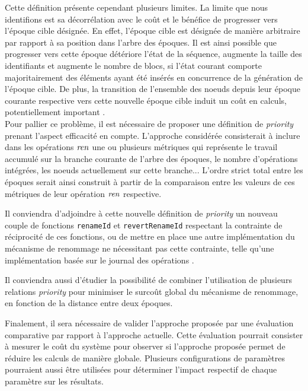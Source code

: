 Cette définition présente cependant plusieurs limites.
La limite que nous identifions est sa décorrélation avec le coût et le bénéfice de progresser vers l'époque cible désignée.
En effet, l'époque cible est désignée de manière arbitraire par rapport à sa position dans l'arbre des époques.
Il est ainsi possible que progresser vers cette époque détériore l'état de la séquence, \ie augmente la taille des identifiants et augmente le nombre de blocs, \eg si l'état courant comporte majoritairement des éléments ayant été insérés en concurrence de la génération de l'époque cible.
De plus, la transition de l'ensemble des noeuds depuis leur époque courante respective vers cette nouvelle époque cible induit un coût en calculs, potentiellement important .\\

Pour pallier ce problème, il est nécessaire de proposer une définition de \emph{priority} prenant l'aspect efficacité en compte.
L'approche considérée consisterait à inclure dans les opérations $\mathit{ren}$ une ou plusieurs métriques qui représente le travail accumulé sur la branche courante de l'arbre des époques, \eg le nombre d'opérations intégrées, les noeuds actuellement sur cette branche...
L'ordre strict total entre les époques serait ainsi construit à partir de la comparaison entre les valeurs de ces métriques de leur opération $\mathit{ren}$ respective.

Il conviendra d'adjoindre à cette nouvelle définition de \emph{priority} un nouveau couple de fonctions \texttt{renameId} et \texttt{revertRenameId} respectant la contrainte de réciprocité de ces fonctions, ou de mettre en place une autre implémentation du mécanisme de renommage ne nécessitant pas cette contrainte, telle qu'une implémentation basée sur le journal des opérations .

Il conviendra aussi d'étudier la possibilité de combiner l'utilisation de plusieurs relations \emph{priority} pour minimiser le surcoût global du mécanisme de renommage, \eg en fonction de la distance entre deux époques.

Finalement, il sera nécessaire de valider l'approche proposée par une évaluation comparative par rapport à l'approche actuelle.
Cette évaluation pourrait consister à mesurer le coût du système pour observer si l'approche proposée permet de réduire les calculs de manière globale.
Plusieurs configurations de paramètres pourraient aussi être utilisées pour déterminer l'impact respectif de chaque paramètre sur les résultats.
